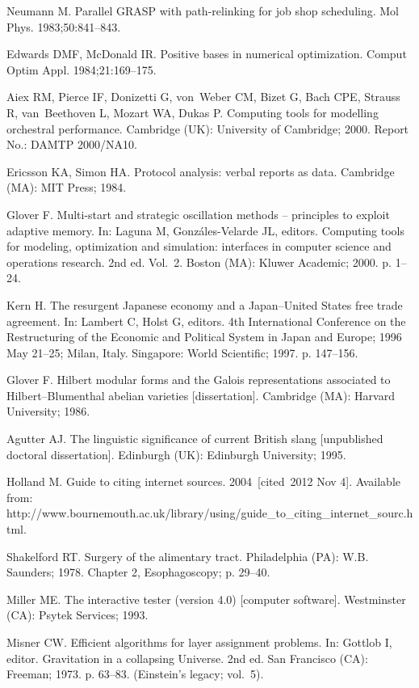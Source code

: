 \documentclass{gCOV2e}
\theoremstyle{plain}%
\theoremstyle{definition}
\theoremstyle{remark}
\begin{document}
\begin{thebibliography}{99}

Neumann M. Parallel GRASP with path-relinking for job shop scheduling. Mol
  Phys. 1983;50:841--843.

Edwards DMF, McDonald IR. Positive bases in numerical optimization. Comput
  Optim Appl. 1984;21:169--175.

Aiex RM, Pierce IF, Donizetti G, von~Weber CM, Bizet G, Bach CPE, Strauss
  R, van~Beethoven L, Mozart WA, Dukas P. Computing tools for modelling
  orchestral performance. Cambridge (UK): University of Cambridge; 2000.
  Report No.: DAMTP 2000/NA10.

Ericsson KA, Simon HA. Protocol analysis: verbal reports as data. Cambridge
  (MA): MIT Press; 1984.

Glover F. Multi-start and strategic oscillation methods -- principles to exploit
  adaptive memory. In: Laguna M, Gonz\'{a}les-Velarde JL, editors. Computing
  tools for modeling, optimization and simulation: interfaces in computer
  science and operations research. 2nd ed. Vol.~2. Boston (MA): Kluwer Academic;
  2000. p. 1--24.

Kern H. The resurgent Japanese economy and a Japan--United States free
  trade agreement. In: Lambert C, Holst G, editors. 4th International
  Conference on the Restructuring of the Economic and Political System in Japan
  and Europe; 1996 May 21--25; Milan, Italy. Singapore: World Scientific;
  1997. p. 147--156.

Glover F. Hilbert modular forms and the Galois representations associated to
  Hilbert--Blumenthal abelian varieties [dissertation]. Cambridge (MA): Harvard
  University; 1986.

Agutter AJ. The linguistic significance of current British slang [unpublished
  doctoral dissertation]. Edinburgh (UK): Edinburgh University; 1995.

Holland M. Guide to citing internet sources. 2004~[cited~2012 Nov 4].
  Available from: http://www.bournemouth.ac.uk/library/using/guide\_to\_citing\_internet\_sourc.html.

Shakelford RT. Surgery of the alimentary tract. Philadelphia (PA): W.B.
Saunders; 1978. Chapter 2, Esophagoscopy; p. 29--40.

Miller ME. The interactive tester (version 4.0) [computer software].
  Westminster (CA): Psytek Services; 1993.

Misner CW. Efficient algorithms for layer assignment problems. In: Gottlob I,
  editor. Gravitation in a collapsing Universe. 2nd ed. San Francisco (CA):
  Freeman; 1973. p. 63--83. (Einstein's legacy; vol.~5).

\end{thebibliography}
\end{document}
